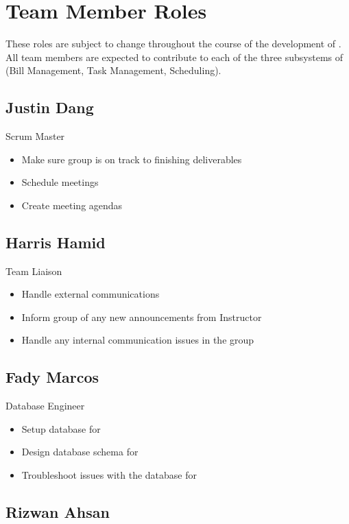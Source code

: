 \documentclass{article}
\begin{document}
\section{Team Member Roles}

These roles are subject to change throughout the course of the development of \progname{}. All team members are expected to contribute to each of the three subsystems of \progname{} (Bill Management, Task Management, Scheduling).

\subsection*{Justin Dang}

Scrum Master
\begin{itemize}
    \item Make sure group is on track to finishing deliverables
    \item Schedule meetings
    \item Create meeting agendas
\end{itemize}

\subsection*{Harris Hamid}

Team Liaison
\begin{itemize}
	\item Handle external communications
    \item Inform group of any new announcements from Instructor
    \item Handle any internal communication issues in the group
\end{itemize}

\subsection*{Fady Marcos}

Database Engineer
\begin{itemize}
    \item Setup database for \progname{}
    \item Design database schema for \progname{}
    \item Troubleshoot issues with the database for \progname{}
\end{itemize}

\subsection*{Rizwan Ahsan}
\end{document}

